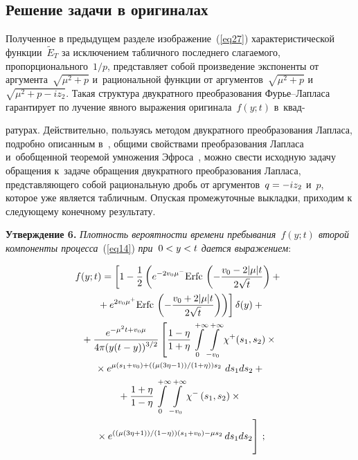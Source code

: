 \begin{multicols}{2}
\vspace*{-4pt}

\section{Решение задачи в оригиналах}

Полученное в предыдущем разделе изображение~(\ref{eq27}) характеристической функции~$\tilde E_T$ за исключением табличного последнего слагаемого, пропорционального~$1/p$, представляет собой произведение экспоненты от аргумента~$\sqrt{\mu^2 + p}$ и~рациональной функции от аргументов~$\sqrt{\mu^2 + p}$ и~$\sqrt{\mu^2 +p - i z_2}$. Такая структура двукратного\linebreak
 преобразования Фурье--Лап\-ла\-са гарантирует по лучение явного выражения оригинала~$f(y;t)$ в~квад-\linebreak\vspace*{-12pt}

 \columnbreak

 \noindent
рату\-рах. Действительно, пользуясь методом двукратного преобразования Лапласа, подробно {описанным} в~\cite{ref17}, общими свойствами преобразования Лапласа и~обобщенной теоремой умножения Эфроса~\cite{ref23}, можно свести исходную задачу обращения к~задаче обращения двукратного преобразования Лапласа, представляющего собой рациональную дробь от аргументов~$q \hm= -i z_2$ и~$p$, которое уже является табличным. Опуская промежуточные выкладки, приходим к следующему конечному результату.

\smallskip

\noindent
\textbf{Утверждение 6.}
\textit{Плотность вероятности времени пребывания~$f(y; t)$ второй компоненты процесса}~(\ref{eq14}) \textit{при~$0\hm<y\hm<t$ дается выражением}:

\noindent
  \begin{multline*}
      f(y; t) = \left[ 1 - \fr{1}{2} \left( e^{-2 v_0 \mu^- } \erfc{ \left( -\fr{v_0 - 2 |\mu| t}{2 \sqrt{t}} \right)} +{}\right.\right.\\
       \left.\left.{}+e^{2 v_0 \mu^+ } \erfc{ \left( -\fr{v_0 + 2 |\mu| t}{2 \sqrt{t}} \right)} \right) \right] \delta(y) +{}\\
      {}+\fr{e^{- \mu^2 t + v_0 \mu}} {4 \pi (y(t-y))^{3/2}}
\left[
 \fr{1-\eta}{1 + \eta}
 \int \limits_0^{+ \infty} \int \limits_{-v_0}^{+ \infty} \chi^+(s_1, s_2)\times{}\right.\\
 {}\times e^{\mu  (s_1 + v_0)+(({\mu (3 \eta -1)})/({1 + \eta})) s_2}\ ds_1 ds_2 +{} \\
{} +  \fr{1 + \eta}{1 - \eta}
\int \limits_0^{+ \infty}
\int\limits_{-v_0}^{+ \infty} \chi^-\left(s_1, s_2\right)\times{}\\
\left.{}\times
e^{ (( \mu (3 \eta +1))/( 1-\eta))  \left(s_1 + v_0\right) - \mu  s_2} \, ds_1 ds_2  \vphantom{\int\limits_{-v_0}^{+ \infty}}\right]\,;
\end{multline*}


\end{multicols}
